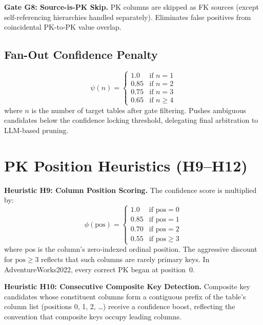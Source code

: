 \documentclass[twocolumn]{svjour3}
\begin{document}
\textbf{Gate G8: Source-is-PK Skip.} PK columns are skipped as FK sources (except self-referencing hierarchies handled separately). Eliminates false positives from coincidental PK-to-PK value overlap.

\subsection{Fan-Out Confidence Penalty}

\begin{equation}
\psi(n) = \begin{cases} 1.0 & \text{if } n = 1 \\ 0.85 & \text{if } n = 2 \\ 0.75 & \text{if } n = 3 \\ 0.65 & \text{if } n \geq 4 \end{cases}
\end{equation}
where $n$ is the number of target tables after gate filtering. Pushes ambiguous candidates below the confidence locking threshold, delegating final arbitration to LLM-based pruning.


\section{PK Position Heuristics (H9--H12)}\label{app:position}

\textbf{Heuristic H9: Column Position Scoring.} The confidence score is multiplied by:
\begin{equation}
\phi(\text{pos}) = \begin{cases} 1.0 & \text{if } \text{pos} = 0 \\ 0.85 & \text{if } \text{pos} = 1 \\ 0.70 & \text{if } \text{pos} = 2 \\ 0.55 & \text{if } \text{pos} \geq 3 \end{cases}
\end{equation}
where pos is the column's zero-indexed ordinal position. The aggressive discount for $\text{pos} \geq 3$ reflects that such columns are rarely primary keys. In AdventureWorks2022, every correct PK began at position~0.

\textbf{Heuristic H10: Consecutive Composite Key Detection.} Composite key candidates whose constituent columns form a contiguous prefix of the table's column list (positions 0, 1, 2, \ldots) receive a confidence boost, reflecting the convention that composite keys occupy leading columns.
\end{document}
